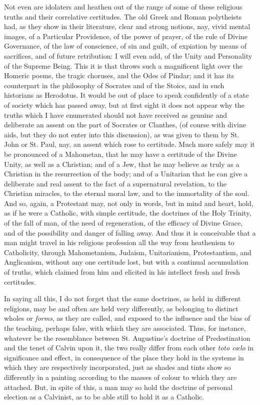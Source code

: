 Not even are idolaters and heathen out of the range of some of
these religious truths and their correlative certitudes. The old Greek
and Roman polytheists had, as they show in their literature, clear and
strong notions, nay, vivid mental images, of a Particular Providence,
of the power of prayer, of the rule of Divine Governance, of the law
of conscience, of sin and guilt, of expiation by means of sacrifices,
and of future retribution: I will even add, of the Unity and
Personality of the Supreme Being. This it is that throws such a
magnificent light over the Homeric poems, the tragic choruses, and the
Odes of Pindar; and it has its counterpart in the philosophy of
Socrates and of the Stoics, and in such historians as Herodotus. It
would be out of place to speak confidently of a state of society which
has passed away, but at first sight it does not appear why the truths
which I have enumerated should not have received as genuine and
deliberate an assent on the part of Socrates or Clanthes, (of course
with divine aids, but they do not enter into this discussion), as was
given to them by St. John or St. Paul, nay, an assent which rose to
certitude. Much more safely may it be pronounced of a Mahometan, that
he may have a certitude of the Divine Unity, as well as a Christian;
and of a Jew, that he may believe as truly as a Christian in the
resurrection of the body; and of a Unitarian that he can give a
deliberate and real assent to the fact of a supernatural revelation,
to the Christian miracles, to the eternal moral law, and to the
immortality of the soul. And so, again, a Protestant may, not only in
words, but in mind and heart, hold, as if he were a Catholic,
with simple certitude, the doctrines of the Holy Trinity, of the fall
of man, of the need of regeneration, of the efficacy of Divine Grace,
and of the possibility and danger of falling away. And thus it is
conceivable that a man might travel in his religious profession all
the way from heathenism to Catholicity, through Mahometanism, Judaism,
Unitarianism, Protestantism, and Anglicanism, without any one
certitude lost, but with a continual accumulation of truths, which
claimed from him and elicited in his intellect fresh and fresh
certitudes.

In saying all this, I do not forget that the same doctrines, as
held in different religions, may be and often are held very
differently, as belonging to distinct wholes or \emph{forms}, as they
are called, and exposed to the influence and the bias of the teaching,
perhaps false, with which they are associated. Thus, for instance,
whatever be the resemblance between St. Augustine's doctrine of
Predestination and the tenet of Calvin upon it, the two really differ
from each other \emph{toto cœlo} in significance and effect, in
consequence of the place they hold in the systems in which they are
respectively incorporated, just as shades and tints show so
differently in a painting according to the masses of colour to which
they are attached. But, in spite of this, a man may so hold the
doctrine of personal election as a Calvinist, as to be able still to
hold it as a Catholic.

